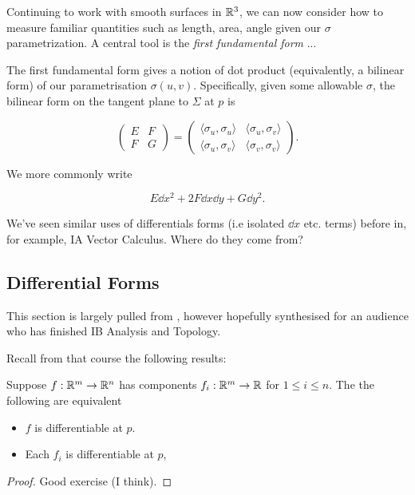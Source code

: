 \documentclass[11pt]{scrartcl}
\begin{document}
Continuing to work with smooth surfaces in $\mathbb R^3$, we can now consider how to measure familiar quantities such as length, area, angle given our $\sigma$ parametrization. A central tool is the \textit{first fundamental form} ... 

The first fundamental form gives a notion of dot product (equivalently, a bilinear form) of our parametrisation $\sigma(u,v)$. Specifically, given some allowable $\sigma$, the bilinear form on the tangent plane to $\Sigma$ at $p$ is

\begin{equation}
    \begin{pmatrix} E & F \\ F & G \end{pmatrix} = \begin{pmatrix} \langle \sigma_u,\sigma_u \rangle & \langle \sigma_u,\sigma_v \rangle \\ \langle \sigma_u,\sigma_v \rangle & \langle \sigma_v,\sigma_v \rangle \end{pmatrix}.    
\end{equation}

We more commonly write

\begin{equation}
    E \dd x^2 + 2F \dd x \dd y + G \dd y^2.
\end{equation}

We've seen similar uses of differentials forms (i.e isolated $\dd x$ etc. terms) before in, for example, IA Vector Calculus. Where do they come from?

\subsection{Differential Forms}

This section is largely pulled from \cite{Napkin}, however hopefully synthesised for an audience who has finished IB Analysis and Topology.

Recall from that course the following results:

\begin{theorem}

    Suppose $f : \mathbb R^m \rightarrow \mathbb R^n$ has components $f_i : \mathbb R^m \rightarrow \mathbb R$ for $1 \le i \le n$. The the following are equivalent

    \begin{itemize}
        \item $f$ is differentiable at $p$.
        \item Each $f_i$ is differentiable at $p$,
    \end{itemize}

    \begin{proof}
        Good exercise (I think).
    \end{proof}
\end{theorem}
\end{document}

